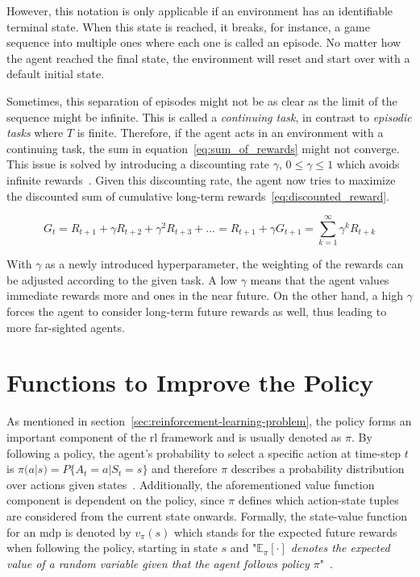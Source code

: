 \documentclass[draft,final]{vutinfth} %
\newcommand{\p}[1]{see p. #1}
\begin{document}
    However, this notation is only applicable if an environment has an identifiable terminal state.
    When this state is reached, it breaks, for instance, a game sequence into multiple ones where each one is called an episode.
    No matter how the agent reached the final state, the environment will reset and start over with a default initial state.

    Sometimes, this separation of episodes might not be as clear as the limit of the sequence might be infinite.
    This is called a \textit{continuing task}, in contrast to \textit{episodic tasks} where $T$ is finite.
    Therefore, if the agent acts in an environment with a continuing task, the sum in equation~\eqref{eq:sum_of_rewards} might not converge.
    This issue is solved by introducing a discounting rate $\gamma$, $0 \leq \gamma \leq 1$ which avoids infinite rewards~\citep[\p{54f}]{sutton_reinforcement_2018}.
    Given this discounting rate, the agent now tries to maximize the discounted sum of cumulative long-term rewards~\eqref{eq:discounted_reward}.

    \begin{equation}
        G_t = R_{t+1} + \gamma R_{t+2}+ \gamma^2 R_{t+3} + \ldots = R_{t+1} + \gamma G_{t+1} = \sum_{k=1}^{\infty} \gamma^k R_{t+k}\label{eq:discounted_reward}
    \end{equation}

    With $\gamma$ as a newly introduced hyperparameter, the weighting of the rewards can be adjusted according to the given task.
    A low $\gamma$ means that the agent values immediate rewards more and ones in the near future.
    On the other hand, a high $\gamma$ forces the agent to consider long-term future rewards as well, thus leading to more far-sighted agents.


    \section{Functions to Improve the Policy}\label{sec:functions-to-improve-the-policy}
    As mentioned in section~\ref{sec:reinforcement-learning-problem}, the policy forms an important component of the \gls{rl} framework and is usually denoted as $\pi$.
    By following a policy, the agent's probability to select a specific action at time-step $t$ is $\pi(a|s) = P\{A_t=a|S_t=s\}$ and therefore $\pi$ describes a probability distribution over actions given states~.
    Additionally, the aforementioned value function component is dependent on the policy, since $\pi$ defines which action-state tuples are considered from the current state onwards.
    Formally, the state-value function for an \gls{mdp} is denoted by $v_\pi(s)$ which stands for the expected future rewards when following the policy, starting in state $s$ and "\textit{$\mathbb{E}_\pi[\cdot]$ denotes the expected value of a random variable given that the agent follows policy $\pi$}"~\citep[\p{58}]{sutton_reinforcement_2018}.
\end{document}
